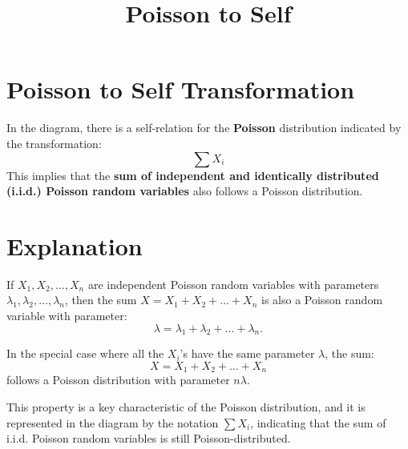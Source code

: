 \documentclass{article}
\title{Poisson to Self}
\author{}
\date{}
\begin{document}
\maketitle

\section*{Poisson to Self Transformation}
In the diagram, there is a self-relation for the \textbf{Poisson} distribution indicated by the transformation:
\[
\sum X_i
\]
This implies that the \textbf{sum of independent and identically distributed (i.i.d.) Poisson random variables} also follows a Poisson distribution.

\section*{Explanation}
If \( X_1, X_2, \dots, X_n \) are independent Poisson random variables with parameters \( \lambda_1, \lambda_2, \dots, \lambda_n \), then the sum \( X = X_1 + X_2 + \dots + X_n \) is also a Poisson random variable with parameter:
\[
\lambda = \lambda_1 + \lambda_2 + \dots + \lambda_n.
\]

In the special case where all the \( X_i \)'s have the same parameter \( \lambda \), the sum:
\[
X = X_1 + X_2 + \dots + X_n
\]
follows a Poisson distribution with parameter \( n\lambda \).

This property is a key characteristic of the Poisson distribution, and it is represented in the diagram by the notation \( \sum X_i \), indicating that the sum of i.i.d. Poisson random variables is still Poisson-distributed.
\end{document}
